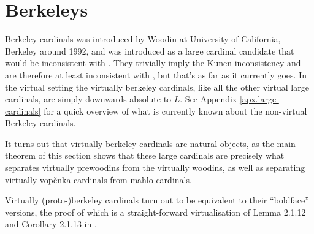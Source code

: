 \documentclass[../../main]{subfiles}
\begin{document}
\section{Berkeleys}

Berkeley cardinals was introduced by Woodin at University of California, Berkeley around 1992, and was introduced as a large cardinal candidate that would be inconsistent with \zf. They trivially imply the Kunen inconsistency and are therefore at least inconsistent with \zfc, but that's as far as it currently goes. In the virtual setting the virtually berkeley cardinals, like all the other virtual large cardinals, are simply downwards absolute to $L$. See Appendix \ref{apx.large-cardinals} for a quick overview of what is currently known about the non-virtual Berkeley cardinals.

\qquad It turns out that virtually berkeley cardinals are natural objects, as the main theorem of this section shows that these large cardinals are precisely what separates virtually prewoodins from the virtually woodins, as well as separating virtually vop\v enka cardinals from mahlo cardinals.


Virtually (proto-)berkeley cardinals turn out to be equivalent to their ``boldface'' versions, the proof of which is a straight-forward virtualisation of Lemma 2.1.12 and Corollary 2.1.13 in \cite{Cutolo}.

\end{document}
